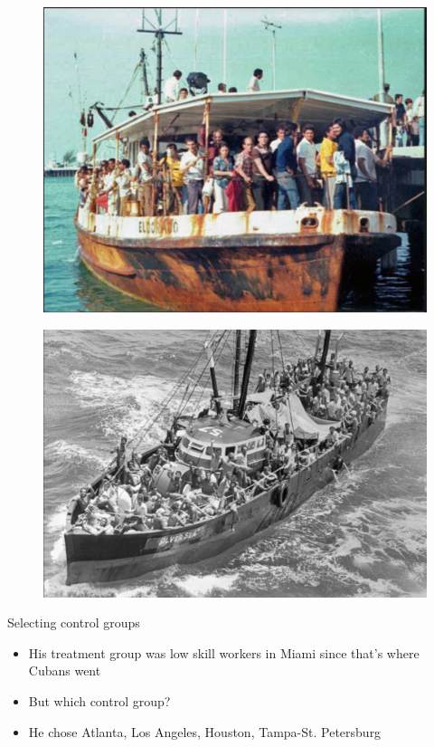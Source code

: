 \documentclass{beamer}
\begin{document}
\begin{frame}[plain]
	\begin{figure}
	\includegraphics[scale=0.25]{./lecture_includes/boatlift3.png}
	\end{figure}
\end{frame}

\begin{frame}[plain]
	\begin{figure}
	\includegraphics[scale=0.25]{./lecture_includes/boatlift4.png}
	\end{figure}
\end{frame}


\begin{frame}{Selecting control groups}

\begin{itemize}

\item His treatment group was low skill workers in Miami since that's where Cubans went
\item But which control group?
\item He chose Atlanta, Los Angeles, Houston, Tampa-St. Petersburg

\end{itemize}

\end{frame}
\end{document}
